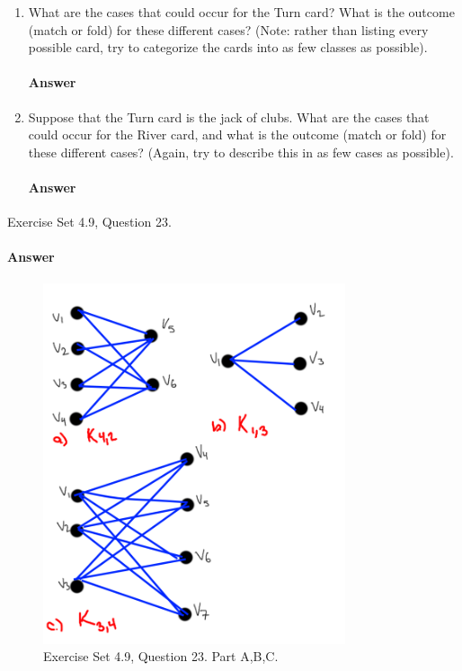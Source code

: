 \documentclass{article}
\begin{document}
\begin{enumerate}

    \item What are the cases that could occur for the Turn card?  What is the
        outcome (match or fold) for these different cases? (Note: rather than
        listing every possible card, try to categorize the cards into as few
        classes as possible).

    \paragraph{Answer}

    \item Suppose that the Turn card is the jack of clubs.
        What are the cases that could occur for the River card, and what is the
        outcome (match or fold) for these different cases?  (Again, try to
        describe this in as few cases as possible).

    \paragraph{Answer}

\end{enumerate}


\collab{\todo{}}

Exercise Set 4.9, Question 23.

\paragraph{Answer}

\begin{figure}[h]
    \centering
    \includegraphics[width=3.5in]{exercise4923}
    \caption{Exercise Set 4.9, Question 23. Part A,B,C.}\label{fig:ex4923}
\end{figure}
\end{document}
